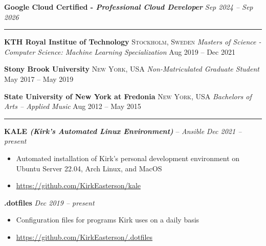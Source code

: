 \documentclass[10pt,letterpaper]{article}
\begin{document}

\headedsection
{\textbf{Google Cloud Certified - \textit{Professional Cloud Developer}}}
{\textit{Sep 2024 -- Sep 2026}} {}
\begin{center}\hrule\end{center}



\headedsection
{\textbf{KTH Royal Institue of Technology}}
{\textsc{Stockholm, Sweden}} {
	\headedsubsection
	{\textit{Masters of Science - Computer Science: Machine Learning Specialization}}
	{Aug 2019 -- Dec 2021}
	{}
}

\headedsection
{\textbf{Stony Brook University}}
{\textsc{New York, USA}} {
	\headedsubsection
	{\textit{Non-Matriculated Graduate Student}}
	{May 2017 -- May 2019}
	{}
}

\headedsection
{\textbf{State University of New York at Fredonia}}
{\textsc{New York, USA}} {
	\headedsubsection
	{\textit{Bachelors of Arts -- Applied Music}}
	{Aug 2012 -- May 2015}
	{}
}
\begin{center}\hrule\end{center}


\headedsection
{\textbf{KALE \textit{(Kirk's Automated Linux Environment)}} -- \textit{Ansible}}
{\textit{Dec 2021 -- present}} {
	\begin{itemize}[noitemsep,nolistsep]
		\item Automated installation of Kirk's personal development environment on Ubuntu Server 22.04, Arch Linux, and MacOS
		\item \url{https://github.com/KirkEasterson/kale}
	\end{itemize}
}

\headedsection
{\textbf{.dotfiles}}
{\textit{Dec 2019 -- present}} {
	\begin{itemize}[noitemsep,nolistsep]
		\item Configuration files for programs Kirk uses on a daily basis
		\item \url{https://github.com/KirkEasterson/.dotfiles}
	\end{itemize}
}
\end{document}
